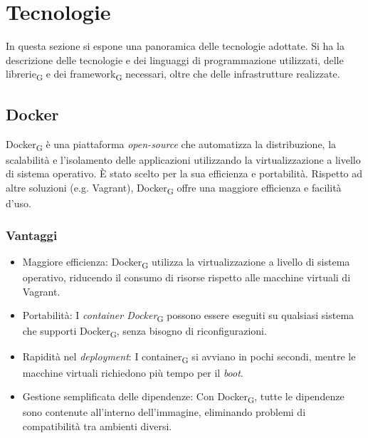\section{Tecnologie }
In questa sezione si espone una panoramica delle tecnologie adottate. Si ha la descrizione delle tecnologie e dei linguaggi di programmazione utilizzati, delle librerie\textsubscript{G} e dei framework\textsubscript{G} necessari, oltre che delle infrastrutture realizzate. 
\subsection{Docker}
Docker\textsubscript{G} è una piattaforma \textit{open-source} che automatizza la distribuzione, la scalabilità e l’isolamento delle applicazioni utilizzando la virtualizzazione a livello di sistema operativo. È stato scelto per la sua efficienza e portabilità. Rispetto ad altre soluzioni (e.g. Vagrant), Docker\textsubscript{G} offre una maggiore efficienza e facilità d’uso.
\subsubsection{Vantaggi}
\begin{itemize}
    \item Maggiore efficienza: Docker\textsubscript{G} utilizza la virtualizzazione a livello di sistema operativo, riducendo il consumo di risorse rispetto alle macchine virtuali di Vagrant.
    \item Portabilità: I \textit{container Docker}\textsubscript{G} possono essere eseguiti su qualsiasi sistema che supporti Docker\textsubscript{G}, senza bisogno di riconfigurazioni.
    \item Rapidità nel \textit{deployment}: I container\textsubscript{G} si avviano in pochi secondi, mentre le macchine virtuali richiedono più tempo per il \textit{boot}.
    \item Gestione semplificata delle dipendenze: Con Docker\textsubscript{G}, tutte le dipendenze sono contenute all'interno dell’immagine, eliminando problemi di compatibilità tra ambienti diversi.
\end{itemize}
